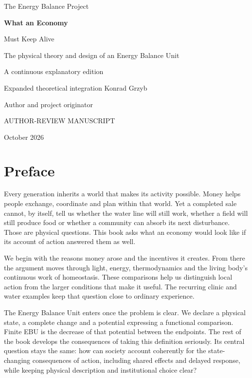 \begin{titlepage}
\color{navy}\sffamily
\noindent\large The Energy Balance Project
\vspace{38pt}
\par\noindent\fontsize{28}{34}\selectfont\bfseries What an Economy\par Must Keep Alive
\vspace{24pt}
\par\noindent\fontsize{17}{23}\selectfont The physical theory and design of an Energy Balance Unit
\vspace{27pt}
\par\noindent\normalfont A continuous explanatory edition\par\small Expanded theoretical integration
\vfill
\noindent\sffamily\Large Konrad Grzyb
\par\normalsize Author and project originator
\vspace{20pt}
\par\small AUTHOR-REVIEW MANUSCRIPT\par October 2026
\end{titlepage}

\chapter*{Preface}
Every generation inherits a world that makes its activity possible. Money helps people exchange, coordinate and plan within that world. Yet a completed sale cannot, by itself, tell us whether the water line will still work, whether a field will still produce food or whether a community can absorb its next disturbance. Those are physical questions. This book asks what an economy would look like if its account of action answered them as well.

We begin with the reasons money arose and the incentives it creates. From there the argument moves through light, energy, thermodynamics and the living body's continuous work of homeostasis. These comparisons help us distinguish local action from the larger conditions that make it useful. The recurring clinic and water examples keep that question close to ordinary experience.

The Energy Balance Unit enters once the problem is clear. We declare a physical state, a complete change and a potential expressing a functional comparison. Finite EBU is the decrease of that potential between the endpoints. The rest of the book develops the consequences of taking this definition seriously. Its central question stays the same: how can society account coherently for the state-changing consequences of action, including shared effects and delayed response, while keeping physical description and institutional choice clear?


